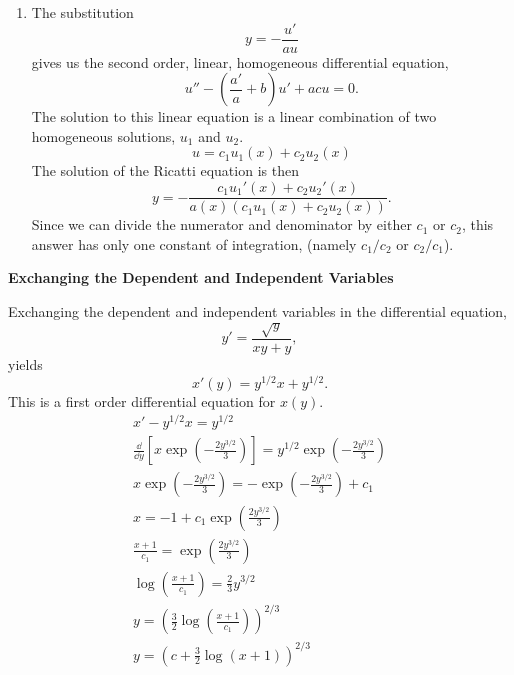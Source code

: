 {\begin{Solution}
\begin{enumerate}
    This is actually a solution, (namely the solution we had before), with 
    one constant of integration, (namely $c - 1/b$).  Thus we see that repeated
    applications of the procedure will not produce more general solutions.
  \item
    The substitution
    \[
    y = - \frac{u'}{a u}
    \]
    gives us the second order, linear, homogeneous differential equation,
    \[
    u'' - \left( \frac{a'}{a} + b \right) u' + a c u = 0.
    \]
    The solution to this linear equation is a linear combination of two 
    homogeneous solutions, $u_1$ and $u_2$.
    \[
    u = c_1 u_1(x) + c_2 u_2(x)
    \]
    The solution of the Ricatti equation is then
    \[
    y = - \frac{ c_1 u_1'(x) + c_2 u_2'(x) }{ a(x) (c_1 u_1(x) + c_2 u_2(x)) }.
    \]
    Since we can divide the numerator and denominator by either $c_1$ or $c_2$,
    this answer has only one constant of integration, (namely $c_1/c_2$ or
    $c_2/c_1$).
  \end{enumerate}
\end{Solution}








\begin{large}
  \noindent
  \textbf{Exchanging the Dependent and Independent Variables}
\end{large}



\begin{Solution}
  \label{solution y'=sqrt y xyy}
  Exchanging the dependent and independent variables in the differential
  equation,
  \[
  y' = \frac{\sqrt{y}}{x y + y},
  \]
  yields
  \[
  x'(y) = y^{1/2} x + y^{1/2}.
  \]
  This is a first order differential equation for $x(y)$.
  \begin{gather*}
    x' - y^{1/2} x = y^{1/2} \\
    \frac{\dd}{\dd y} \left[ x \exp \left(-\frac{2 y^{3/2}}{3} \right) \right] =
    y^{1/2} \exp \left(-\frac{2 y^{3/2}}{3} \right) \\
    x \exp \left(-\frac{2 y^{3/2}}{3} \right)
    = - \exp \left(-\frac{2 y^{3/2}}{3} \right) + c_1 \\
    x = -1 + c_1 \exp \left(\frac{2 y^{3/2}}{3}\right) \\
    \frac{x+1}{c_1} = \exp\left(\frac{2 y^{3/2}}{3}\right) \\
    \log \left( \frac{x+1}{c_1} \right) = \frac{2}{3} y^{3/2} \\
    y = \left( \frac{3}{2} \log \left(\frac{x+1}{c_1} \right) \right)^{2/3} \\
    \boxed{
      y = \left( c + \frac{3}{2} \log (x + 1) \right)^{2/3}
      }
  \end{gather*}
\end{Solution}



}
